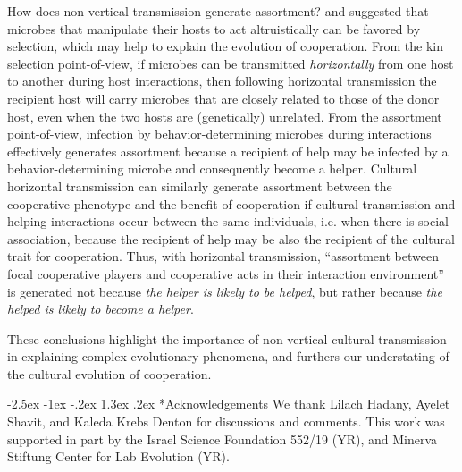 \documentclass[12pt]{extarticle}
\makeatletter
\renewcommand\section{\@startsection {section}{1}{\z@}%
     {-2.5ex \@plus -1ex \@minus -.2ex}%
     {1.3ex \@plus.2ex}%
    {\Large\bfseries}}
\makeatother
\begin{document}
How does non-vertical transmission generate assortment? 
\citet{lewin2017microbes} and \citet{lewin2020rockpaperscissors} 
suggested that microbes that manipulate their hosts to act altruistically can be favored by selection, which may help to explain the evolution of cooperation. 
From the kin selection point-of-view, if microbes can be transmitted \emph{horizontally} from one host to another during host interactions, then following horizontal transmission the recipient host will carry microbes that are closely related to those of the donor host, 
even when the two hosts are (genetically) unrelated. 
From the assortment point-of-view,
infection by behavior-determining microbes during interactions effectively generates assortment because a recipient of help may be infected by a behavior-determining microbe and consequently become a helper.
Cultural horizontal transmission can similarly generate assortment between the cooperative phenotype and the benefit of cooperation if cultural transmission and helping interactions occur between the same individuals, i.e. when there is social association, because the recipient of help may be also the recipient of the cultural trait for cooperation. 
Thus, with horizontal transmission, ``assortment between focal cooperative players and cooperative acts in their interaction
environment''~\citep{Fletcher2009assortment} is generated not because \emph{the helper is likely to be helped}, but rather because \emph{the helped is likely to become a helper}.

These conclusions highlight the importance of non-vertical cultural transmission in explaining complex evolutionary phenomena, and  furthers our understating of the cultural evolution of cooperation. 



{\small
\section*{Acknowledgements}
We thank Lilach Hadany, Ayelet Shavit, and Kaleda Krebs Denton for discussions and comments.
This work was supported in part by
the Israel Science Foundation 552/19 (YR),
and Minerva Stiftung Center for Lab Evolution (YR).
}
\end{document}
